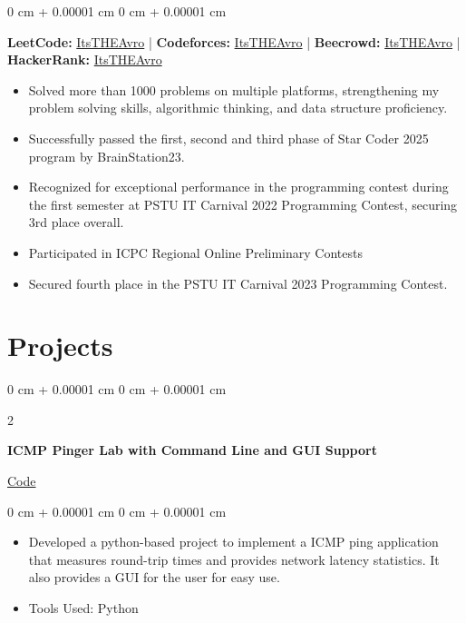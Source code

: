 \documentclass[10pt, letterpaper]{article}
\newenvironment{highlights}{
    \begin{itemize}[
        topsep=0.10 cm,
        parsep=0.10 cm,
        partopsep=0pt,
        itemsep=0pt,
        leftmargin=0 cm + 10pt
    ]
}{
    \end{itemize}
} %
\newenvironment{onecolentry}{
    \begin{adjustwidth}{
        0 cm + 0.00001 cm
    }{
        0 cm + 0.00001 cm
    }
}{
    \end{adjustwidth}
} %
\newenvironment{twocolentry}[2][]{
    \onecolentry
    \def\secondColumn{#2}
    \setcolumnwidth{\fill, 4.5 cm}
    \begin{paracol}{2}
}{
    \switchcolumn \raggedleft \secondColumn
    \end{paracol}
    \endonecolentry
} %
\begin{document}
\begin{onecolentry}
	    
	\begin{center}
		\textbf{LeetCode: }\href{https://leetcode.com/u/ItsTHEAvro/}{ItsTHEAvro}
		|
		\textbf{Codeforces: }\href{https://codeforces.com/profile/ItsTHEAvro/}{ItsTHEAvro}
		|
		\textbf{Beecrowd: }\href{https://judge.beecrowd.com/en/profile/260423}{ItsTHEAvro}
		|
		\textbf{HackerRank: }\href{https://www.hackerrank.com/profile/ItsTHEAvro}{ItsTHEAvro} 
	\end{center}
	\vspace{0.1 cm}
	
	\begin{highlights}
		\item Solved more than 1000 problems on multiple platforms, strengthening my problem solving skills, algorithmic thinking, and data structure proficiency.
		\item Successfully passed the first, second and third phase of Star Coder 2025 program by BrainStation23.
		\item Recognized for exceptional performance in the programming contest during the first semester at PSTU IT Carnival 2022 Programming Contest, securing 3rd place overall.
		\item Participated in ICPC Regional Online Preliminary Contests
		\item Secured fourth place in the PSTU IT Carnival 2023 Programming Contest.
	\end{highlights}
	
\end{onecolentry}

\section{Projects}

\begin{twocolentry}{
		\href{https://github.com/ItsTHEAvro/ICMP_Pinger_Lab}{Code}
	}
	\textbf{ICMP Pinger Lab with Command Line and GUI Support}
\end{twocolentry}
\vspace{0.10 cm}
\begin{onecolentry}
	\begin{highlights}
		\item Developed a python-based project to implement a ICMP ping application that measures round-trip times and provides network latency statistics. It also provides a GUI for the user for easy use.
		\item Tools Used: Python
	\end{highlights}
\end{onecolentry}
\vspace{0.2 cm}
\end{document}
